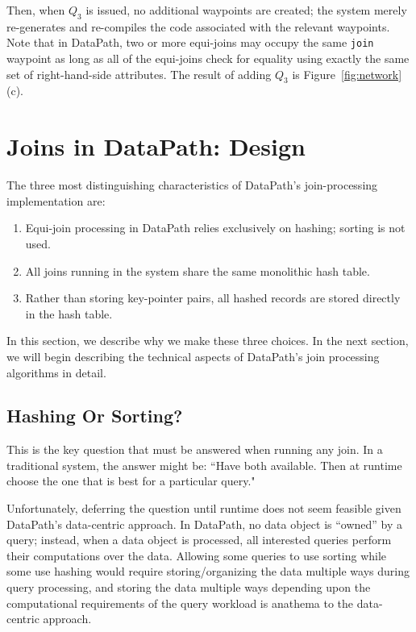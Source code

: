 \documentclass{sig-alternate}
\renewcommand\:{\colon} %
\begin{document}
Then, when $Q_3$ is issued, no additional waypoints are created; the system merely re-generates and re-compiles
the code associated with the relevant waypoints.  Note that in DataPath, two or more equi-joins may occupy the same \texttt{join} waypoint
as long as all of the equi-joins check for equality using exactly the same set of right-hand-side attributes.  
The result of adding $Q_3$ is Figure~\ref{fig:network}(c).

\section{Joins in DataPath: Design}

The three most distinguishing characteristics of DataPath's join-processing implementation are:

\begin{enumerate}

\item Equi-join processing in DataPath relies exclusively on hashing; sorting is not used.

\item All joins running in the system share the same monolithic hash table.

\item Rather than storing key-pointer pairs, all hashed records are stored directly in the hash table.

\end{enumerate}

In this section, we describe why we make these three choices.  In the next section, we will begin describing the technical
aspects of DataPath's join processing algorithms in detail.

\subsection{Hashing Or Sorting?}
This is the key question that must be answered when running any join.
In a traditional system, the answer might be: ``Have both available. Then at runtime
choose the one that is best for a particular query."

Unfortunately, deferring the question until runtime does not seem feasible given DataPath's data-centric approach.
In DataPath, no data object is ``owned'' by a query; instead, when a data object is processed, all interested
queries perform their computations over the data.
Allowing some queries to use sorting while some use hashing would require 
storing/organizing the data multiple ways during query processing, and
storing the data multiple ways depending upon the computational
requirements of the query workload is anathema to the data-centric approach.
\end{document}
